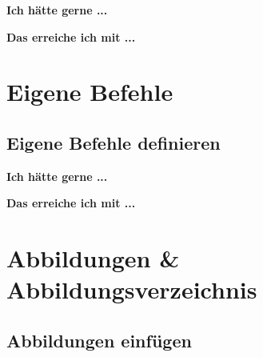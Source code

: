 \documentclass[twoside, 
               a4paper, 
               10pt, 
               parskip=full, 
               sectionentrydots=true, 
               listof=totoc, 
               listof=entryprefix,
               numbers=endperiod]{scrartcl}
\begin{document}
{\textbf {Ich hätte gerne ...}}
 
\begin{miniSeite}[colbacktitle=black!35!white,title=Ausdruck]

\end{miniSeite}


\newpage
{\textbf {Das erreiche ich mit ...}}
 
\begin{miniSeite}[colbacktitle=black!35!white,title=\LaTeX-Code]

\end{miniSeite}





\newpage
\section{Eigene Befehle}
\subsection{Eigene Befehle definieren}

{\textbf {Ich hätte gerne ...}}
 
\begin{miniSeite}[colbacktitle=black!35!white,title=Ausdruck]

\end{miniSeite}


\newpage
{\textbf {Das erreiche ich mit ...}}
 
\begin{miniSeite}[colbacktitle=black!35!white,title=\LaTeX-Code]

\end{miniSeite}




\newpage
\section{Abbildungen \& Abbildungsverzeichnis}
\subsection{Abbildungen einfügen}
\end{document}
